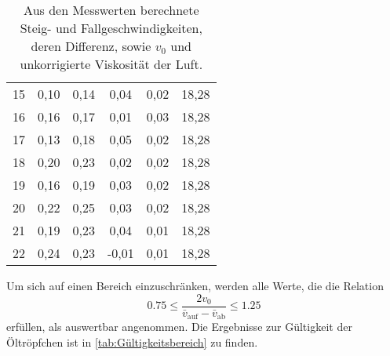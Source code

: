 \begin{table}[!ht]
\begin{tabular}{c c c c c c}
         15&   0,10 &                  0,14 &                      0,04 &  0,02 &          18,28  \\
         16&  0,16 &                  0,17 &                      0,01 &  0,03 &          18,28  \\
         17&   0,13 &                  0,18 &                      0,05 &  0,02 &          18,28  \\
         18&   0,20 &                  0,23 &                      0,02 &  0,02 &          18,28  \\
         19&   0,16 &                  0,19 &                      0,03 &  0,02 &          18,28  \\
         20&   0,22 &                  0,25 &                      0,03 &  0,02 &          18,28  \\
         21&   0,19 &                  0,23 &                      0,04 &  0,01 &          18,28  \\
         22&   0,24 &                  0,23 &                     -0,01 &  0,01 &          18,28  \\
        \bottomrule
    \end{tabular}
    \caption{Aus den Messwerten berechnete Steig- und Fallgeschwindigkeiten, deren Differenz, 
	sowie $v_0$ und unkorrigierte Viskosität der Luft.}
    \label{tab:Tabelle2}
\end{table}

Um sich auf einen Bereich einzuschränken, werden alle Werte, die die Relation 
\begin{equation*}
    0.75\leq \frac{2v_0}{\bar{v}_{\text{auf}}-\bar{v}_{\text{ab}}}\leq 1.25
\end{equation*}
erfüllen, als auswertbar angenommen. Die Ergebnisse zur Gültigkeit der Öltröpfchen ist in \autoref{tab:Gültigkeitsbereich} 
zu finden.


